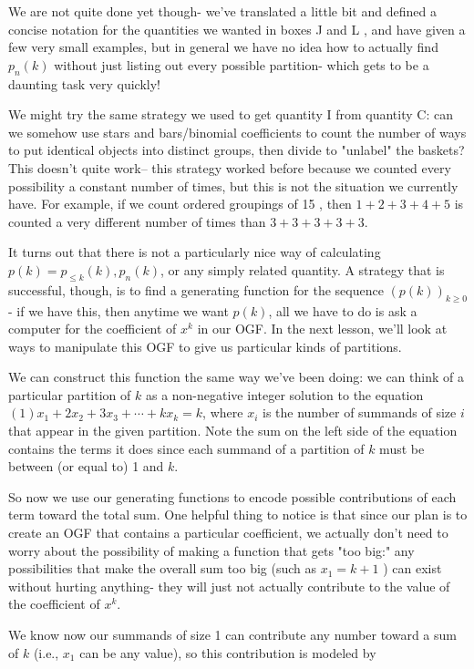 \documentclass{article}
\theoremstyle{definition}
\begin{document}
We are not quite done yet though- we've translated a little bit and defined a concise notation for the quantities we wanted in boxes J and L , and have given a few very small examples, but in general we have no idea how to actually find $p_{n}(k)$ without just listing out every possible partition- which gets to be a daunting task very quickly!

We might try the same strategy we used to get quantity I from quantity C: can we somehow use stars and bars/binomial coefficients to count the number of ways to put identical objects into distinct groups, then divide to "unlabel" the baskets? This doesn't quite work-- this strategy worked before because we counted every possibility a constant number of times, but this is not the situation we currently have. For example, if we count ordered groupings of 15 , then $1+2+3+4+5$ is counted a very different number of times than $3+3+3+3+3$.

It turns out that there is not a particularly nice way of calculating $p(k)=p_{\leq k}(k), p_{n}(k)$, or any simply related quantity. A strategy that is successful, though, is to find a generating function for the sequence $(p(k))_{k \geq 0}$ - if we have this, then anytime we want $p(k)$, all we have to do is ask a computer for the coefficient of $x^{k}$ in our OGF. In the next lesson, we'll look at ways to manipulate this OGF to give us particular kinds of partitions.

We can construct this function the same way we've been doing: we can think of a particular partition of $k$ as a non-negative integer solution to the equation $(1) x_{1}+2 x_{2}+3 x_{3}+\cdots+k x_{k}=k$, where $x_{i}$ is the number of summands of size $i$ that appear in the given partition. Note the sum on the left side of the equation contains the terms it does since each summand of a partition of $k$ must be between (or equal to) 1 and $k$.

So now we use our generating functions to encode possible contributions of each term toward the total sum. One helpful thing to notice is that since our plan is to create an OGF that contains a particular coefficient, we actually don't need to worry about the possibility of making a function that gets "too big:" any possibilities that make the overall sum too big (such as $x_{1}=k+1$ ) can exist without hurting anything- they will just not actually contribute to the value of the coefficient of $x^{k}$.

We know now our summands of size 1 can contribute any number toward a sum of $k$ (i.e., $x_{1}$ can be any value), so this contribution is modeled by
\end{document}
